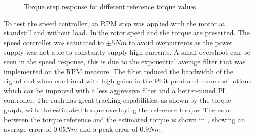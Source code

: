 \begin{figure}[!htb]
\begin{subfigmatrix}{3}
	\end{subfigmatrix}
	\caption{Torque step response for different reference torque values.}
	\label{fig:tq_step_response_multiple}
\end{figure}


To test the speed controller, an RPM step was applied with the motor at standstill and without load. In  the rotor speed and the torque are presented. The speed controller was saturated to $\pm 5Nm$ to avoid overcurrents as the power supply was not able to constantly supply high currents. A small overshoot can be seen in the speed response, this is due to the exponential average filter that was implemented on the RPM measure. The filter reduced the bandwidth of the signal and when combined with high gains in the PI it produced some oscillations which can be improved with a less aggressive filter and a better-tuned PI controller. The \gls{rush} has great tracking capabilities, as shown by the torque graph, with the estimated torque overlaying the reference torque. The error between the torque reference and the estimated torque is shown in , showing an average error of $0.05Nm$ and a peak error of $0.9Nm$.


